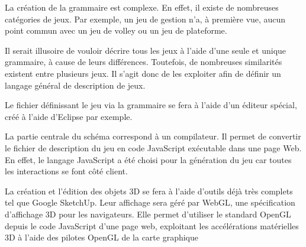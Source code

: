 La création de la grammaire est complexe. En effet, il existe de nombreuses catégories de jeux.
Par exemple, un jeu de gestion n'a, à première vue, aucun point commun avec un jeu de volley ou un jeu de plateforme.

Il serait illusoire de vouloir décrire tous les jeux à l'aide d'une seule et unique grammaire, à cause de leurs différences.
Toutefois, de nombreuses similarités existent entre plusieurs jeux. Il s'agit donc de les exploiter afin de définir un langage général de description de jeux.

Le fichier définissant le jeu via la grammaire se fera à l'aide d'un éditeur spécial, créé à l'aide d'Eclipse par exemple.

La partie centrale du schéma correspond à un compilateur.
Il permet de convertir le fichier de description du jeu en code JavaScript exécutable dans une page Web.
En effet, le langage JavaScript a été choisi pour la génération du jeu car toutes les interactions se font côté client.

La création et l'édition des objets 3D se fera à l'aide d'outils déjà très complets tel que Google SketchUp.
Leur affichage sera géré par WebGL, une spécification d'affichage 3D pour les navigateurs. 
Elle permet d'utiliser le standard OpenGL depuis le code JavaScript d'une page web, 
exploitant les accélérations matérielles 3D à l'aide des pilotes OpenGL de la carte graphique